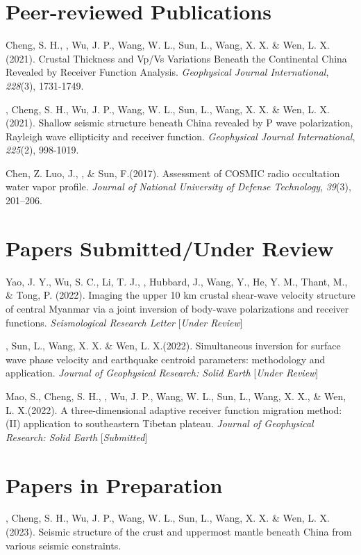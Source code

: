 \newcommand{\Revision}{\textit{under revision}}
\newcommand{\CS}{*} %
\newcommand{\CF}{\textsuperscript{\#}} %


\section*{Peer-reviewed Publications}

\begin{etaremune}
\item
    Cheng, S. H., \Xiao, Wu, J. P., Wang, W. L., Sun, L., Wang, X. X. \& Wen, L. X.(2021).
    Crustal Thickness and Vp/Vs Variations Beneath the Continental China Revealed by Receiver Function Analysis.
    \textit{Geophysical Journal International}, \textit{228}(3), 1731-1749.  
\item
    \Xiao, Cheng, S. H., Wu, J. P., Wang, W. L., Sun, L., Wang, X. X. \& Wen, L. X.(2021).
    Shallow seismic structure beneath China revealed by P wave polarization, Rayleigh wave ellipticity and receiver function.
    \textit{Geophysical Journal International}, \textit{225}(2), 998-1019. 
\item
    Chen, Z. Luo, J.,  \Xiao, \& Sun, F.(2017).
    Assessment of COSMIC radio occultation water vapor profile.
    \textit{Journal of National University of Defense Technology}, \textit{39}(3), 201--206.
\end{etaremune}

\section*{Papers Submitted/Under Review}
\begin{etaremune}
\item
    Yao, J. Y., Wu, S. C., Li, T. J., \Xiao, Hubbard, J., Wang, Y., He, Y. M., Thant, M., \& Tong, P. (2022).
    Imaging the upper 10 km crustal shear-wave velocity structure of central Myanmar via a joint inversion of body-wave polarizations and receiver functions.
    \textit{Seismological Research Letter} [\textit{Under Review}]
\item
    \Xiao, Sun, L., Wang, X. X. \& Wen, L. X.(2022).
    Simultaneous inversion for surface wave phase velocity and earthquake centroid parameters: methodology and application.
    \textit{Journal of Geophysical Research: Solid Earth} [\textit{Under Review}]
\item
    Mao, S., Cheng, S. H., \Xiao, Wu, J. P., Wang, W. L., Sun, L., Wang, X. X., \& Wen, L. X.(2022).
    A three-dimensional adaptive receiver function migration method: (II) application to southeastern Tibetan plateau.
    \textit{Journal of Geophysical Research: Solid Earth} [\textit{Submitted}]
\end{etaremune}

\section*{Papers in Preparation}
\begin{etaremune}
\item
    \Xiao, Cheng, S. H., Wu, J. P., Wang, W. L., Sun, L., Wang, X. X. \& Wen, L. X.(2023).
    Seismic structure of the crust and uppermost mantle beneath China from various seismic constraints.
\end{etaremune}

